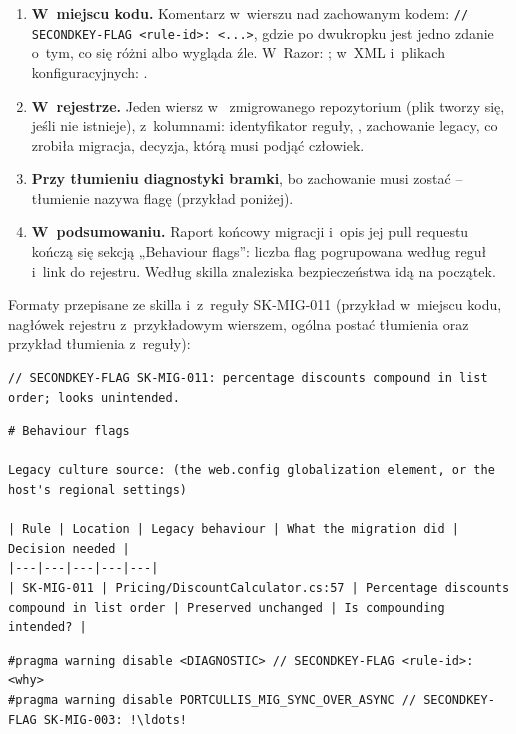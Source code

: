 \begin{enumerate}
  \item \textbf{W~miejscu kodu.} Komentarz w~wierszu nad zachowanym kodem:
        \texttt{// SECONDKEY-FLAG <rule-id>: <...>}, gdzie po dwukropku jest jedno zdanie
        o~tym, co się różni albo wygląda źle. W~Razor:
        ; w~XML i~plikach konfiguracyjnych:
        .
  \item \textbf{W~rejestrze.} Jeden wiersz w~
        zmigrowanego repozytorium (plik tworzy się, jeśli nie istnieje), z~kolumnami:
        identyfikator reguły, , zachowanie legacy, co zrobiła migracja,
        decyzja, którą musi podjąć człowiek.
  \item \textbf{Przy tłumieniu diagnostyki bramki}, bo zachowanie musi zostać -- tłumienie
        nazywa flagę (przykład poniżej).
  \item \textbf{W~podsumowaniu.} Raport końcowy migracji i~opis jej pull requestu kończą się
        sekcją „Behaviour flags”: liczba flag pogrupowana według reguł i~link do rejestru.
        Według skilla znaleziska bezpieczeństwa idą na początek.
\end{enumerate}

Formaty przepisane ze skilla i~z~reguły SK-MIG-011 (przykład w~miejscu kodu, nagłówek rejestru
z~przykładowym wierszem, ogólna postać tłumienia oraz przykład tłumienia z~reguły):

\begin{lstlisting}
// SECONDKEY-FLAG SK-MIG-011: percentage discounts compound in list order; looks unintended.
\end{lstlisting}

\begin{lstlisting}
# Behaviour flags

Legacy culture source: (the web.config globalization element, or the host's regional settings)

| Rule | Location | Legacy behaviour | What the migration did | Decision needed |
|---|---|---|---|---|
| SK-MIG-011 | Pricing/DiscountCalculator.cs:57 | Percentage discounts compound in list order | Preserved unchanged | Is compounding intended? |
\end{lstlisting}

\begin{lstlisting}[escapechar=!]
#pragma warning disable <DIAGNOSTIC> // SECONDKEY-FLAG <rule-id>: <why>
#pragma warning disable PORTCULLIS_MIG_SYNC_OVER_ASYNC // SECONDKEY-FLAG SK-MIG-003: !\ldots!
\end{lstlisting}

